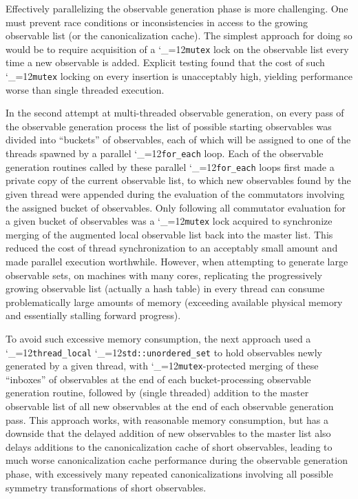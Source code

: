 \documentclass [12pt]{article}
\makeatletter
\renewcommand{\tt}{\begingroup\catcode`_=12\def\_{\string_}\tt@}
\newcommand{\tt@}[1]{\texttt{#1}\endgroup}
\makeatother
\begin{document}
Effectively parallelizing
the observable generation phase is more challenging.
One must prevent race conditions or inconsistencies in access
to the growing observable list (or the canonicalization cache).
The simplest approach for doing so would be to require
acquisition of a \tt{mutex} lock on
the observable list every time a new observable is added.
Explicit testing found that the cost of such
\tt{mutex} locking on every insertion 
is unacceptably high, yielding performance worse than
single threaded execution.

In the second attempt at multi-threaded observable
generation,
on every pass of the observable generation process
the list of possible starting observables was
divided into ``buckets'' of observables,
each of which will be assigned to one of the
threads spawned by a parallel \tt{for_each} loop.
Each of the observable generation routines called by
these parallel \tt{for_each} loops
first made a private copy of the current
observable list, to which new observables
found by the given thread were appended
during the evaluation of the commutators
involving the assigned bucket of observables.
Only following all commutator evaluation
for a given bucket of observables
was a \tt{mutex} lock acquired to synchronize merging of the
augmented local observable list back into the master list.
This reduced the cost of thread synchronization to an
acceptably small amount and made parallel execution
worthwhile.
However, when attempting to generate large observable sets,
on machines with many cores, replicating the
progressively growing observable list
(actually a hash table) in every thread can consume
problematically large amounts of memory (exceeding available physical
memory and essentially stalling forward progress).

To avoid such excessive memory consumption,
the next approach used a \tt{thread_local} 
\tt{std::unordered_set} to hold observables newly generated
by a given thread, with \tt{mutex}-protected merging of these
``inboxes'' of observables at the end of each bucket-processing
observable generation routine, followed by (single threaded)
addition to the master observable list of all new observables
at the end of each observable generation pass.
This approach works, with reasonable memory consumption,
but has a downside that the delayed addition of new observables
to the master list also delays additions to the canonicalization
cache of short observables,
leading to much worse canonicalization cache performance
during the observable generation phase,
with excessively many repeated canonicalizations involving
all possible symmetry transformations of short observables.
\end{document}
